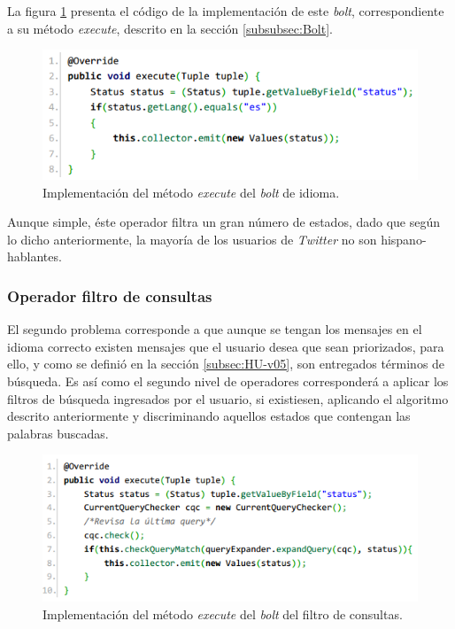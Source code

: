 La figura \ref{fig:operadorIdioma} presenta el código de la implementación de este \textit{bolt}, correspondiente a su método \textit{execute}, descrito en la sección \ref{subsubsec:Bolt}.

\begin{figure}[H]
	\centering
	\captionsetup{justification=centering}
	\includegraphics[scale=0.8]{images/LanguageBoltExecute.png}
	\caption[Implementación del método \textit{execute} del \textit{bolt} de idioma.]{Implementación del método \textit{execute} del \textit{bolt} de idioma.}
	\label{fig:operadorIdioma}
\end{figure}

Aunque simple, éste operador filtra un gran número de estados, dado que según lo dicho anteriormente, la mayoría de los usuarios de \textit{Twitter} no son hispano-hablantes. 

\subsubsection{Operador filtro de consultas}
\label{subsubsec:2op}

El segundo problema corresponde a que aunque se tengan los mensajes en el idioma correcto existen mensajes que el usuario desea que sean priorizados, para ello, y como se definió en la sección \ref{subsec:HU-v05}, son entregados términos de búsqueda. Es así como el segundo nivel de operadores corresponderá a aplicar los filtros de búsqueda ingresados por el usuario, si existiesen, aplicando el algoritmo descrito anteriormente y discriminando aquellos estados que contengan las palabras buscadas.

\begin{figure}[H]
	\centering
	\captionsetup{justification=centering}
	\includegraphics[scale=0.8]{images/FilterBolt.png}
	\caption[Implementación del método \textit{execute} del \textit{bolt} del filtro de consultas.]{Implementación del método \textit{execute} del \textit{bolt} del filtro de consultas.}
	\label{fig:operadorFiltro}
\end{figure}


